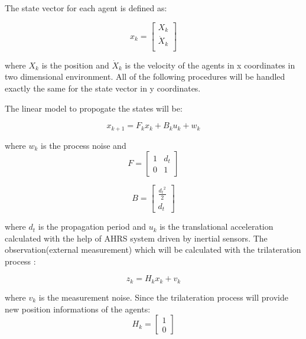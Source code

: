The state vector for each agent is defined as:

\begin{equation}
x_k = \begin{bmatrix}
X_k \\
\dot{X}_k\\
\end{bmatrix}
\end{equation}
	
where $X_k$ is the position and $\dot{X}_k$ is the velocity of the agents in x coordinates in two dimensional environment. All of the following procedures will be handled exactly the same for the state vector in y coordinates.

The linear model to propogate the states will be:

\begin{equation}
x_{k+1} = F_k     x_{k} + B_ku_k + w_k
\end{equation}
	
where $w_k$ is the process noise and 
\begin{equation}
F = \begin{bmatrix}
1 & d_t\\
0 & 1
\end{bmatrix}   
\end{equation}
	
\begin{equation}
B = \begin{bmatrix}
\frac{{d_t}^2}{2} \\
d_t
\end{bmatrix}
\end{equation}

where $d_t$ is the propagation period and $u_k$ is the translational acceleration calculated with the help of AHRS system driven by inertial sensors. The observation(external measurement) which will be calculated with the trilateration process :

\begin{equation}
z_k = H_kx_k + v_k
\end{equation}

where $v_k$ is the measurement noise. Since the trilateration process will provide new position informations of the agents:
\begin{equation}
H_k = \begin{bmatrix}
1\\0
\end{bmatrix}
\end{equation}
	
